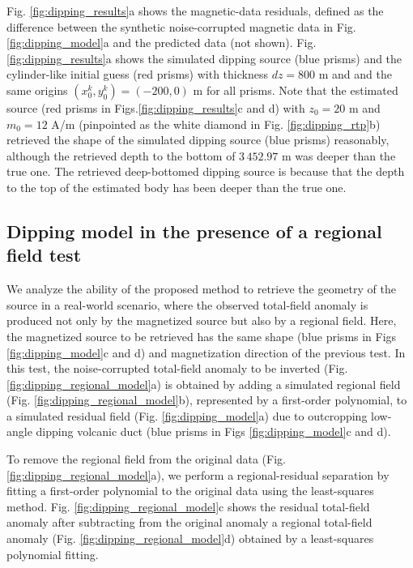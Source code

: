 Fig. \ref{fig:dipping_results}a shows the magnetic-data residuals, defined as the difference
between the synthetic noise-corrupted magnetic data in Fig. \ref{fig:dipping_model}a 
and the predicted data (not shown).
Fig. \ref{fig:dipping_results}a shows the simulated dipping source (blue prisms) and 
the cylinder-like initial guess (red prisms) with thickness $ dz = 800 $ m and 
and the same origins $(x^k_0, y^k_0) = (-200, 0) $ m for all prisms.
Note that the estimated source (red prisms in Figs.\ref{fig:dipping_results}c and d)
with $z_0 = 20$ m and $m_0 = 12$ A/m 
(pinpointed as the white diamond in Fig. \ref{fig:dipping_rtp}b)
retrieved the shape of the simulated dipping source (blue prisms) reasonably, although
the retrieved depth to the bottom of $ 3\,452.97 $ m was deeper than the true one.
The retrieved deep-bottomed dipping source is because that the depth to the top 
of the estimated body has been deeper than the true one.


\subsection{Dipping model in the presence of a regional field test}

We analyze the ability of the proposed method to retrieve the geometry of the source
in a real-world scenario, where the observed total-field anomaly is produced not only by 
the magnetized source but also by a regional field. 
Here, the magnetized source to be retrieved has the same shape (blue prisms in Figs \ref{fig:dipping_model}c and d) and magnetization direction of the previous test. 
In this test, the noise-corrupted total-field anomaly to be inverted 
(Fig. \ref{fig:dipping_regional_model}a) is obtained by adding 
a simulated regional field (Fig. \ref{fig:dipping_regional_model}b), 
represented by a first-order polynomial, 
to a simulated residual field (Fig. \ref{fig:dipping_model}a) due to outcropping low-angle dipping volcanic duct (blue prisms in Figs \ref{fig:dipping_model}c and d). 

To remove the regional field from the original data (Fig. \ref{fig:dipping_regional_model}a),
we perform a regional-residual separation by fitting a first-order polynomial 
to the original data using the least-squares method.
Fig. \ref{fig:dipping_regional_model}c shows the residual total-field anomaly after subtracting from the original anomaly a regional total-field anomaly 
(Fig. \ref{fig:dipping_regional_model}d) obtained by a least-squares polynomial fitting. 

